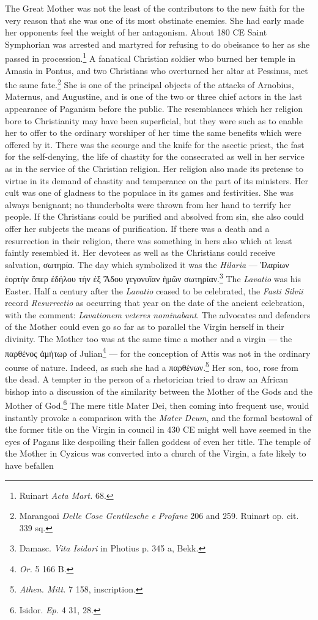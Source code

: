 \documentclass[a4paper, 11pt, oneside, polutonikogreek, english]{article}
\begin{document}
The Great Mother was not the least of the contributors to the new faith for the very reason that she was one of its most obstinate enemies. She had early made her opponents feel the weight of her antagonism. About 180 \textsc{CE} Saint Symphorian was arrested and martyred for refusing to do obeisance to her as she passed in procession.\footnote{Ruinart \emph{Acta Mart.} 68.} A fanatical Christian soldier who burned her temple in Amasia in Pontus, and two Christians who overturned her altar at Pessinus, met the same fate.\footnote{Marangoai \emph{Delle Cose Gentilesche e Profane} 206 and 259. Ruinart op. cit. 339 sq.} She is one of the principal objects of the attacks of Arnobius, Maternus, and Augustine, and is one of the two or three chief actors in the last appearance of Paganism before the public. The resemblances which her religion bore to Christianity may have been superficial, but they were such as to enable her to offer to the ordinary worshiper of her time the same benefits which were offered by it. There was the scourge and the knife for the ascetic priest, the fast for the self-denying, the life of chastity for the consecrated as well in her service as in the service of the Christian religion. Her religion also made its pretense to virtue in its demand of chastity and temperance on the part of its ministers. Her cult was one of gladness to the populace in its games and festivities. She was always benignant; no thunderbolts were thrown from her hand to terrify her people. If the Christians could be purified and absolved from sin, she also could offer her subjects the means of purification. If there was a death and a resurrection in their religion, there was something in hers also which at least faintly resembled it. Her devotees as well as the Christians could receive salvation, σωτηρία. The day which symbolized it was the \emph{Hilaria} --- Ἱλαρίων ἑορτὴν ὅπερ ἐδήλου τὴν ἐξ Ἄδου γεγονυῖαν ἡμῶν σωτηρίαν.\footnote{Damasc. \emph{Vita Isidori} in Photius p. 345 a, Bekk.} The \emph{Lavatio} was his Easter. Half a century after the \emph{Lavatio} ceased to be celebrated, the \emph{Fasti Silvii} record \emph{Resurrectio} as occurring that year on the date of the ancient celebration, with the comment: \emph{Lavationem veteres nominabant}. The advocates and defenders of the Mother could even go so far as to parallel the Virgin herself in their divinity. The Mother too was at the same time a mother and a virgin --- the παρθένος ἀμήτωρ of Julian\footnote{\emph{Or.} 5 166 B.} --- for the conception of Attis was not in the ordinary course of nature. Indeed, as such she had a παρθένων.\footnote{\emph{Athen. Mitt.} 7 158, inscription.} Her son, too, rose from the dead. A tempter in the person of a rhetorician tried to draw an African bishop into a discussion of the similarity between the Mother of the Gods and the Mother of God.\footnote{Isidor. \emph{Ep.} 4 31, 28.} The mere title Mater Dei, then coming into frequent use, would instantly provoke a comparison with the \emph{Mater Deum}, and the formal bestowal of the former title on the Virgin in council in 430 \textsc{CE} might well have seemed in the eyes of Pagans like despoiling their fallen goddess of even her title. The temple of the Mother in Cyzicus was converted into a church of the Virgin, a fate likely to have befallen 
\end{document}
